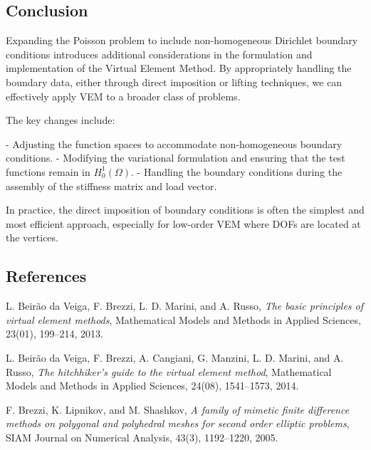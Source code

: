 \documentclass[class=article, crop=false]{standalone}
\begin{document}
\subsection{Conclusion}

Expanding the Poisson problem to include non-homogeneous Dirichlet boundary conditions introduces additional considerations in the formulation and implementation of the Virtual Element Method. By appropriately handling the boundary data, either through direct imposition or lifting techniques, we can effectively apply VEM to a broader class of problems.

The key changes include:

- Adjusting the function spaces to accommodate non-homogeneous boundary conditions.
- Modifying the variational formulation and ensuring that the test functions remain in $H_0^1(\Omega)$.
- Handling the boundary conditions during the assembly of the stiffness matrix and load vector.

In practice, the direct imposition of boundary conditions is often the simplest and most efficient approach, especially for low-order VEM where DOFs are located at the vertices.

\subsection{References}

\begin{thebibliography}{9}

L. Beir\~ao da Veiga, F. Brezzi, L. D. Marini, and A. Russo,
\newblock \emph{The basic principles of virtual element methods},
\newblock Mathematical Models and Methods in Applied Sciences, 23(01), 199--214, 2013.

L. Beir\~ao da Veiga, F. Brezzi, A. Cangiani, G. Manzini, L. D. Marini, and A. Russo,
\newblock \emph{The hitchhiker's guide to the virtual element method},
\newblock Mathematical Models and Methods in Applied Sciences, 24(08), 1541--1573, 2014.

F. Brezzi, K. Lipnikov, and M. Shashkov,
\newblock \emph{A family of mimetic finite difference methods on polygonal and polyhedral meshes for second order elliptic problems},
\newblock SIAM Journal on Numerical Analysis, 43(3), 1192--1220, 2005.

\end{thebibliography}

\newpage
\end{document}
